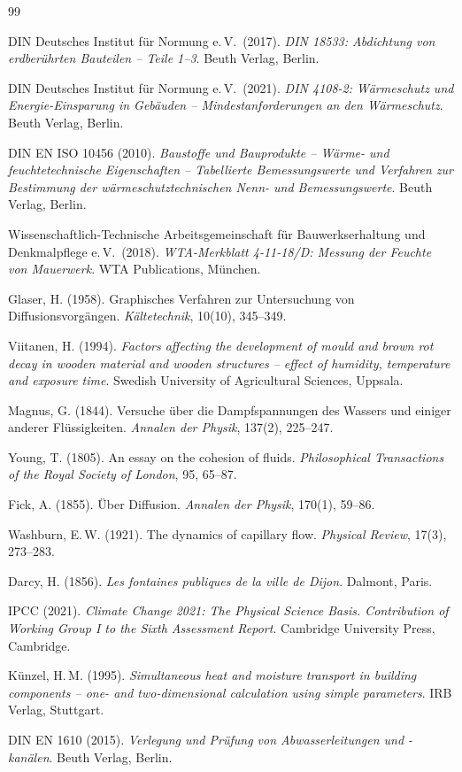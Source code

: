 ﻿\documentclass[a4paper,12pt]{article}
\theoremstyle{definition}
\begin{document}
\begin{thebibliography}{99}

DIN Deutsches Institut f\"ur Normung e.\,V.\ (2017).
\textit{DIN 18533: Abdichtung von erdber\"uhrten Bauteilen -- Teile 1--3}.
Beuth Verlag, Berlin.

DIN Deutsches Institut f\"ur Normung e.\,V.\ (2021).
\textit{DIN 4108-2: W\"armeschutz und Energie-Einsparung in Geb\"auden --
Mindestanforderungen an den W\"armeschutz}.
Beuth Verlag, Berlin.

DIN EN ISO 10456 (2010).
\textit{Baustoffe und Bauprodukte -- W\"arme- und feuchtetechnische
Eigenschaften -- Tabellierte Bemessungswerte und Verfahren zur Bestimmung
der w\"armeschutztechnischen Nenn- und Bemessungswerte}.
Beuth Verlag, Berlin.

Wissenschaftlich-Technische Arbeitsgemeinschaft f\"ur Bauwerkserhaltung
und Denkmalpflege e.\,V.\ (2018).
\textit{WTA-Merkblatt 4-11-18/D: Messung der Feuchte von Mauerwerk}.
WTA Publications, M\"unchen.

Glaser, H. (1958).
Graphisches Verfahren zur Untersuchung von Diffusionsvorg\"angen.
\textit{K\"altetechnik}, 10(10), 345--349.

Viitanen, H. (1994).
\textit{Factors affecting the development of mould and brown rot decay
in wooden material and wooden structures -- effect of humidity,
temperature and exposure time}.
Swedish University of Agricultural Sciences, Uppsala.

Magnus, G. (1844).
Versuche \"uber die Dampfspannungen des Wassers und einiger anderer
Fl\"ussigkeiten.
\textit{Annalen der Physik}, 137(2), 225--247.

Young, T. (1805).
An essay on the cohesion of fluids.
\textit{Philosophical Transactions of the Royal Society of London},
95, 65--87.

Fick, A. (1855).
\"Uber Diffusion.
\textit{Annalen der Physik}, 170(1), 59--86.

Washburn, E.\,W. (1921).
The dynamics of capillary flow.
\textit{Physical Review}, 17(3), 273--283.

Darcy, H. (1856).
\textit{Les fontaines publiques de la ville de Dijon}.
Dalmont, Paris.

IPCC (2021).
\textit{Climate Change 2021: The Physical Science Basis.
Contribution of Working Group I to the Sixth Assessment Report}.
Cambridge University Press, Cambridge.

K\"unzel, H.\,M. (1995).
\textit{Simultaneous heat and moisture transport in building components --
one- and two-dimensional calculation using simple parameters}.
IRB Verlag, Stuttgart.

DIN EN 1610 (2015).
\textit{Verlegung und Pr\"ufung von Abwasserleitungen und -kan\"alen}.
Beuth Verlag, Berlin.

\end{thebibliography}
\end{document}
